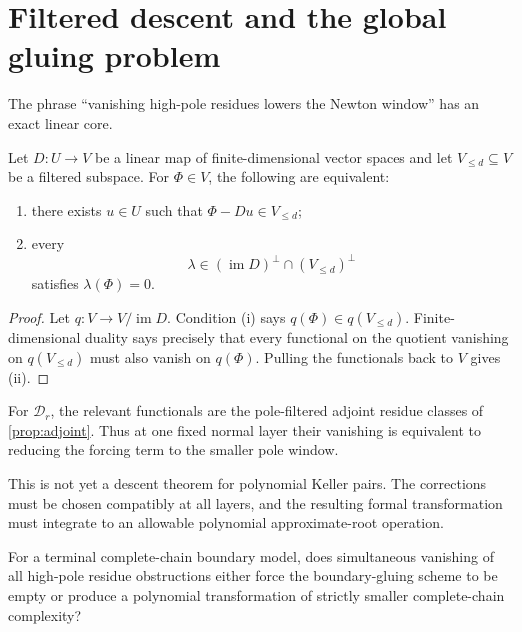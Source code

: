 \documentclass[11pt,reqno]{amsart}
\begin{document}
\section{Filtered descent and the global gluing problem}
\label{sec:descent}

The phrase ``vanishing high-pole residues lowers the Newton window'' has an
exact linear core.

\begin{lemma}
\label{lem:filtered}
Let \(D:U\to V\) be a linear map of finite-dimensional vector spaces and
let \(V_{\le d}\subseteq V\) be a filtered subspace.  For
\(\Phi\in V\), the following are equivalent:
\begin{enumerate}[label=(\roman*)]
\item there exists \(u\in U\) such that
\(\Phi-Du\in V_{\le d}\);
\item every
\[
\lambda\in(\operatorname{im}D)^\perp
\cap(V_{\le d})^\perp
\]
satisfies \(\lambda(\Phi)=0\).
\end{enumerate}
\end{lemma}

\begin{proof}
Let \(q:V\to V/\operatorname{im}D\).  Condition (i) says
\(q(\Phi)\in q(V_{\le d})\).  Finite-dimensional duality says precisely
that every functional on the quotient vanishing on \(q(V_{\le d})\) must
also vanish on \(q(\Phi)\).  Pulling the functionals back to \(V\) gives
(ii).
\end{proof}

For \(\mathscr D_r\), the relevant functionals are the pole-filtered
adjoint residue classes of \cref{prop:adjoint}.  Thus at one fixed normal
layer their vanishing is equivalent to reducing the forcing term to the
smaller pole window.

This is not yet a descent theorem for polynomial Keller pairs.  The
corrections must be chosen compatibly at all layers, and the resulting
formal transformation must integrate to an allowable polynomial
approximate-root operation.

\begin{question}
\label{q:integrable}
For a terminal complete-chain boundary model, does simultaneous vanishing
of all high-pole residue obstructions either force the boundary-gluing
scheme to be empty or produce a polynomial transformation of strictly
smaller complete-chain complexity?
\end{question}
\end{document}
